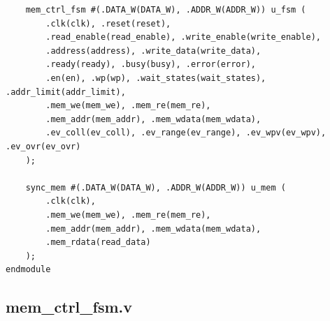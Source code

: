 \documentclass[11pt,a4paper]{article}
\begin{document}
\begin{lstlisting}
    mem_ctrl_fsm #(.DATA_W(DATA_W), .ADDR_W(ADDR_W)) u_fsm (
        .clk(clk), .reset(reset),
        .read_enable(read_enable), .write_enable(write_enable),
        .address(address), .write_data(write_data),
        .ready(ready), .busy(busy), .error(error),
        .en(en), .wp(wp), .wait_states(wait_states), .addr_limit(addr_limit),
        .mem_we(mem_we), .mem_re(mem_re),
        .mem_addr(mem_addr), .mem_wdata(mem_wdata),
        .ev_coll(ev_coll), .ev_range(ev_range), .ev_wpv(ev_wpv), .ev_ovr(ev_ovr)
    );

    sync_mem #(.DATA_W(DATA_W), .ADDR_W(ADDR_W)) u_mem (
        .clk(clk),
        .mem_we(mem_we), .mem_re(mem_re),
        .mem_addr(mem_addr), .mem_wdata(mem_wdata),
        .mem_rdata(read_data)
    );
endmodule
\end{lstlisting}
\subsection{mem\_ctrl\_fsm.v}
\end{document}
